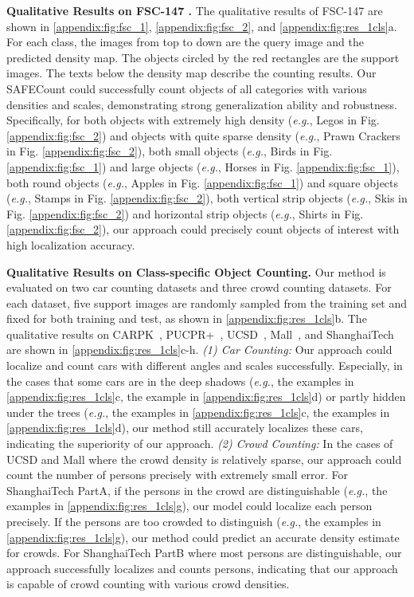 \documentclass[10pt,twocolumn,letterpaper]{article}
\newcommand{\method}{SAFECount\xspace}
\begin{document}
\vspace{2pt}\noindent\textbf{Qualitative Results on FSC-147 \cite{famnet}.} 
The qualitative results of FSC-147 are shown in  \cref{appendix:fig:fsc_1}, \cref{appendix:fig:fsc_2}, and \cref{appendix:fig:res_1cls}a. 
For each class, the images from top to down are the query image and the predicted density map. 
The objects circled by the red rectangles are the support images. 
The texts below the density map describe the counting results. 
Our \method could successfully count objects of all categories with various densities and scales, demonstrating strong generalization ability and robustness. 
Specifically, for both objects with extremely high density (\textit{e.g.}, Legos in Fig. \ref{appendix:fig:fsc_2}) and objects with quite sparse density (\textit{e.g.}, Prawn Crackers in Fig. \ref{appendix:fig:fsc_2}), both small objects (\textit{e.g.}, Birds in Fig. \ref{appendix:fig:fsc_1}) and large objects (\textit{e.g.}, Horses in Fig. \ref{appendix:fig:fsc_1}), both round objects (\textit{e.g.}, Apples in Fig. \ref{appendix:fig:fsc_1}) and square objects (\textit{e.g.}, Stamps in Fig. \ref{appendix:fig:fsc_2}), both vertical strip objects (\textit{e.g.}, Skis in Fig. \ref{appendix:fig:fsc_2}) and horizontal strip objects (\textit{e.g.}, Shirts in Fig. \ref{appendix:fig:fsc_2}), our approach could precisely count objects of interest with high localization accuracy. 


\vspace{2pt}\noindent\textbf{Qualitative Results on Class-specific Object Counting.}
Our method is evaluated on two car counting datasets and three crowd counting datasets. 
For each dataset, five support images are randomly sampled from the training set and fixed for both training and test, as shown in \cref{appendix:fig:res_1cls}b. 
The qualitative results on CARPK~\cite{lpn}, PUCPR+~\cite{lpn}, UCSD~\cite{ucsd}, Mall~\cite{mall}, and ShanghaiTech~\cite{mcnn} are shown in \cref{appendix:fig:res_1cls}c-h. 
\textit{(1) Car Counting:} Our approach could localize and count cars with different angles and scales successfully. 
Especially, in the cases that some cars are in the deep shadows (\textit{e.g.}, the  examples in \cref{appendix:fig:res_1cls}c, the  example in \cref{appendix:fig:res_1cls}d) or partly hidden under the trees (\textit{e.g.}, the  examples in \cref{appendix:fig:res_1cls}c, the  examples in \cref{appendix:fig:res_1cls}d), our method still accurately localizes these cars, indicating the superiority of our approach.
\textit{(2) Crowd Counting:} In the cases of UCSD and Mall where the crowd density is relatively sparse, our approach could count the number of persons precisely with extremely small error. 
For ShanghaiTech PartA, if the persons in the crowd are distinguishable (\textit{e.g.}, the  examples in \cref{appendix:fig:res_1cls}g), our model could localize each person precisely. If the persons are too crowded to distinguish (\textit{e.g.}, the  examples in \cref{appendix:fig:res_1cls}g), our method could predict an accurate density estimate for crowds. 
For ShanghaiTech PartB where most persons are distinguishable, our approach successfully localizes and counts persons, indicating that our approach is capable of crowd counting with various crowd densities. 
\end{document}
